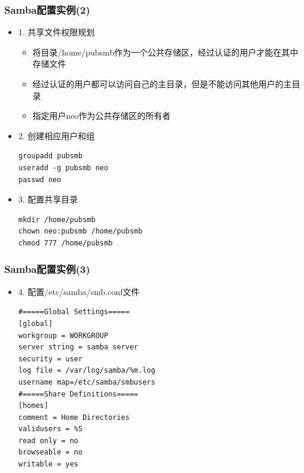 \documentclass[xcolor=svgnames,presentation]{beamer}
\begin{document}
\begin{frame}[fragile]
\frametitle{Samba配置实例(2)}
\label{sec-2-7}
\begin{itemize}

\item 1. 共享文件权限规划
\label{sec-2-7-1}%
\begin{itemize}

\item 将目录/home/pubsmb作为一个公共存储区，经过认证的用户才能在其中存储文件
\label{sec-2-7-1-1}%

\item 经过认证的用户都可以访问自己的主目录，但是不能访问其他用户的主目录
\label{sec-2-7-1-2}%

\item 指定用户neo作为公共存储区的所有者
\label{sec-2-7-1-3}%
\end{itemize} %

\item 2. 创建相应用户和组\\
\label{sec-2-7-2}%
\begin{verbatim}
groupadd pubsmb
useradd -g pubsmb neo
passwd neo
\end{verbatim}

\item 3. 配置共享目录\\
\label{sec-2-7-3}%
\begin{verbatim}
mkdir /home/pubsmb
chown neo:pubsmb /home/pubsmb
chmod 777 /home/pubsmb
\end{verbatim}
\end{itemize} %
\end{frame}
\begin{frame}[fragile]
\frametitle{Samba配置实例(3)}
\label{sec-2-8}
\begin{itemize}

\item 4. 配置/etc/samba/smb.conf文件\\
\label{sec-2-8-1}%
\begin{verbatim}
#=====Global Settings=====
[global]
workgroup = WORKGROUP
server string = samba server
security = user
log file = /var/log/samba/%m.log
username map=/etc/samba/smbusers
#=====Share Definitions=====
[homes]
comment = Home Directories
validusers = %S
read only = no
browseable = no
writable = yes
\end{verbatim}
\end{itemize} %
\end{frame}
\end{document}
